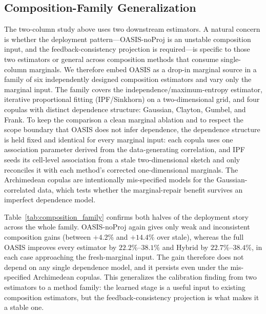\documentclass[preprint,12pt]{elsarticle}
\newcommand{\oasisUseMaxWidthResize}[1]{%
  \renewcommand{\resizebox}[3]{\adjustbox{max width=#1}{##3}}%
}
\begin{document}
\subsection{Composition-Family Generalization}
\label{sec:composition-family}

The two-column study above uses two downstream estimators. A natural concern is
whether the deployment pattern---OASIS-noProj is an unstable composition input,
and the feedback-consistency projection is required---is specific to those two
estimators or general across composition methods that consume single-column
marginals. We therefore embed OASIS as a drop-in marginal source in a family of
six independently designed composition estimators and vary only the marginal
input. The family covers the independence/maximum-entropy estimator,
iterative proportional fitting (IPF/Sinkhorn) on a two-dimensional grid, and
four copulas with distinct dependence structure: Gaussian, Clayton, Gumbel, and
Frank. To keep the comparison a clean marginal ablation and to respect the scope
boundary that OASIS does not infer dependence, the dependence structure is held
fixed and identical for every marginal input: each copula uses one association
parameter derived from the data-generating correlation, and IPF seeds its
cell-level association from a stale two-dimensional sketch and only reconciles it
with each method's corrected one-dimensional marginals. The Archimedean copulas
are intentionally mis-specified models for the Gaussian-correlated data, which
tests whether the marginal-repair benefit survives an imperfect dependence model.

\begingroup
\oasisUseMaxWidthResize{.96\textwidth}

\endgroup

Table~\ref{tab:composition_family} confirms both halves of the deployment story
across the whole family. OASIS-noProj again gives only weak and inconsistent
composition gains (between $+4.2\%$ and $+14.4\%$ over stale), whereas the full
OASIS improves every estimator by $22.2\%$--$38.1\%$ and Hybrid by
$22.7\%$--$38.4\%$, in each case approaching the fresh-marginal input. The gain
therefore does not depend on any single dependence model, and it persists even
under the mis-specified Archimedean copulas. This generalizes the calibration
finding from two estimators to a method family: the learned stage is a useful
input to existing composition estimators, but the feedback-consistency
projection is what makes it a stable one.
\end{document}

